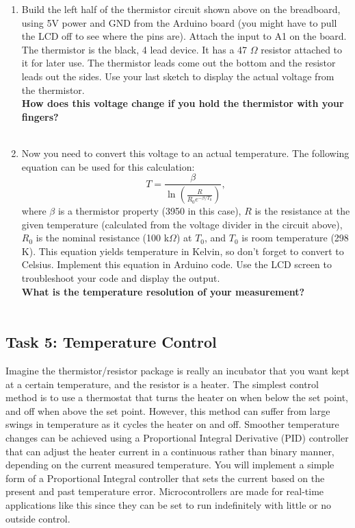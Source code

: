 \documentclass[12pt]{article}
\begin{document}
\begin{enumerate}
\item Build the left half of the thermistor circuit shown above on the breadboard, 
using 5V power and GND from the Arduino board (you might have to pull the LCD off to see where the pins are). 
Attach the input to A1 on the board. 
The thermistor is the black, 4 lead device. 
It has a 47 $\Omega$ resistor attached to it for later use. 
The thermistor leads come out the bottom and the resistor leads out the sides. 
Use your last sketch to display the actual voltage from the thermistor.\\
{\bf How does this voltage change if you hold the thermistor with your fingers?}\\
\bigskip \bigskip \bigskip \\
\item Now you need to convert this voltage to an actual temperature. The following equation can be used for this calculation:
\[
	T = \frac{\beta}{\ln \left(\frac{R}{R_0e^{-\beta/T_0}}\right)},
\]
where $\beta$ is a thermistor property (3950 in this case), 
$R$ is the resistance at the given temperature (calculated from the voltage divider in the circuit above), 
$R_0$ is the nominal resistance (100 k$\Omega$) at $T_0$, and $T_0$ 
is room temperature (298 K). 
This equation yields temperature in Kelvin, so don't forget to convert to Celsius. 
Implement this equation in Arduino code. 
Use the LCD screen to troubleshoot your code and display the output.\\
{\bf What is the temperature resolution of your measurement?}\\
\bigskip \bigskip \bigskip \\
\end{enumerate}

\subsection*{Task 5: Temperature Control}

Imagine the thermistor/resistor package is really an incubator that you want kept at a certain temperature,
and the resistor is a heater. 
The simplest control method is to use a thermostat that turns the heater on when below the set point, and off when above the set point. 
However, this method can suffer from large swings in temperature as it cycles the heater on and off. 
Smoother temperature changes can be achieved using a 
Proportional Integral Derivative (PID) controller that can 
adjust the heater current in a continuous rather than binary manner, 
depending on the current measured temperature. 
You will implement a simple form of a Proportional Integral controller that 
sets the current based on the present and past temperature error. 
Microcontrollers are made for real-time applications like this since 
they can be set to run indefinitely with little or no outside control. 
\end{document}
